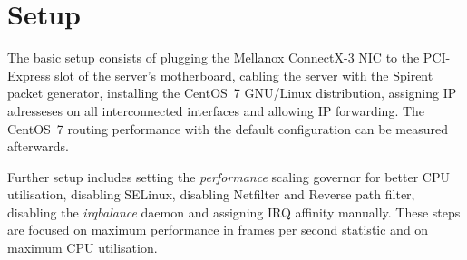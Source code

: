 
\chapter{Setup}\label{chap:setup}
The basic setup consists of plugging the Mellanox ConnectX-3 NIC to the PCI-Express slot of the server's motherboard,
cabling the server with the Spirent packet generator,
installing the CentOS~7 GNU/Linux distribution, assigning IP adresseses on all interconnected interfaces
and allowing IP forwarding.
The CentOS~7 routing performance with the default configuration can be measured afterwards.

Further setup includes setting the {\it{performance}} scaling governor for better CPU utilisation,
disabling SELinux, disabling Netfilter and Reverse path filter,
disabling the {\it{irqbalance}} daemon and assigning IRQ affinity manually.
These steps are focused on maximum performance in frames per second statistic
and on maximum CPU utilisation.








